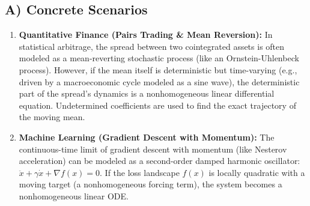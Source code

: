 \documentclass[11pt]{article}
\begin{document}
\subsection{A) Concrete Scenarios}
\begin{enumerate}
    \item \textbf{Quantitative Finance (Pairs Trading \& Mean Reversion):} In statistical arbitrage, the spread between two cointegrated assets is often modeled as a mean-reverting stochastic process (like an Ornstein-Uhlenbeck process). However, if the mean itself is deterministic but time-varying (e.g., driven by a macroeconomic cycle modeled as a sine wave), the deterministic part of the spread's dynamics is a nonhomogeneous linear differential equation. Undetermined coefficients are used to find the exact trajectory of the moving mean.
    \item \textbf{Machine Learning (Gradient Descent with Momentum):} The continuous-time limit of gradient descent with momentum (like Nesterov acceleration) can be modeled as a second-order damped harmonic oscillator: $\ddot{x} + \gamma \dot{x} + \nabla f(x) = 0$. If the loss landscape $f(x)$ is locally quadratic with a moving target (a nonhomogeneous forcing term), the system becomes a nonhomogeneous linear ODE.
\end{enumerate}
\end{document}
